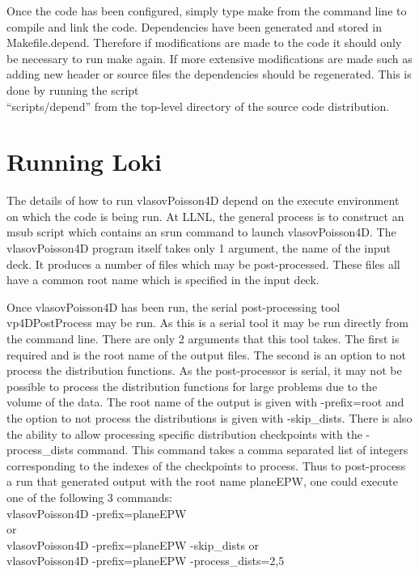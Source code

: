 \documentclass[11pt]{amsart}
\begin{document}
Once the code has been configured, simply type make from the command line to
compile and link the code.  Dependencies have been generated and stored in
Makefile.depend.  Therefore if modifications are made to the code it should
only be necessary to run make again.  If more extensive modifications are made
such as adding new header or source files the dependencies should be
regenerated.  This is done by running the script \\
``scripts/depend'' from the top-level directory of the source code
distribution.

\section*{Running Loki}
The details of how to run vlasovPoisson4D depend on the execute environment on
which the code is being run.  At LLNL, the general process is to construct an
msub script which contains an srun command to launch vlasovPoisson4D.  The
vlasovPoisson4D program itself takes only 1 argument, the name of the input
deck.  It produces a number of files which may be post-processed.  These files
all have a common root name which is specified in the input deck.

Once vlasovPoisson4D has been run, the serial post-processing tool
vp4DPostProcess may be run.  As this is a serial tool it may be run directly
from the command line.  There are only 2 arguments that this tool takes.  The
first is required and is the root name of the output files.  The second is an
option to not process the distribution functions.  As the post-processor is
serial, it may not be possible to process the distribution functions for large
problems due to the volume of the data.  The root name of the output is given
with -prefix=root and the option to not process the distributions is given with
-skip\_dists.  There is also the ability to allow processing specific
distribution checkpoints with the -process\_dists command.  This command takes a
comma separated list of integers corresponding to the indexes of the checkpoints
to process.  Thus to post-process a run that generated output with the root
name planeEPW, one could execute one of the following 3 commands: \\
vlasovPoisson4D -prefix=planeEPW \\
or \\
vlasovPoisson4D -prefix=planeEPW -skip\_dists
or \\
vlasovPoisson4D -prefix=planeEPW -process\_dists=2,5
\end{document}

